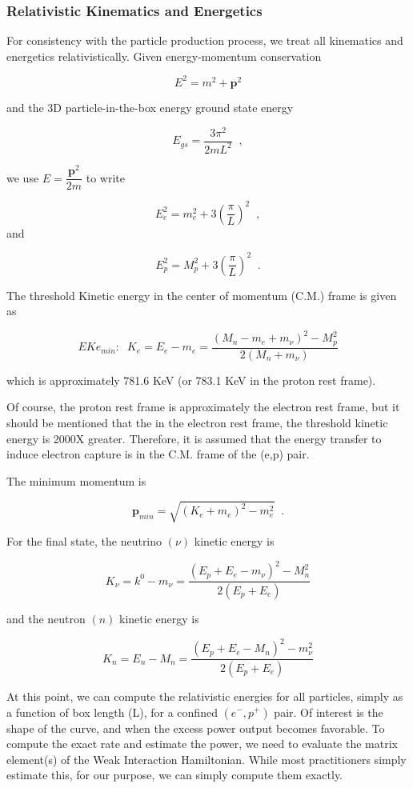 \documentclass[%
 aip,
 jmp,%
 amsmath,amssymb,
 reprint,%
]{revtex4-1}
\begin{document}
\subsubsection{Relativistic Kinematics and Energetics}
For consistency with the particle production process, we treat all kinematics and energetics relativistically.  Given energy-momentum conservation

$$E^{2}=m^{2}+\mathbf{p}^{2}$$

and the 3D particle-in-the-box energy ground state energy 

$$E_{gs}=\dfrac{3\pi^{2}}{2mL^{2}}\;\;,$$

we use $E=\dfrac{\mathbf{p}^{2}}{2m}$ to write

$$E^{2}_{e}=m^{2}_{e}+3\left(\dfrac{\pi}{L}\right)^{2}\;\;,$$ and

$$E^{2}_{p}=M^{2}_{p}+3\left(\dfrac{\pi}{L}\right)^{2}\;\;.$$

The threshold Kinetic energy in the center of momentum (C.M.) frame is given as

$$EKe_{min}:\;\;K_{e}=E_{e}-m_{e}=\dfrac{(M_{n}-m_{e}+m_{\nu})^{2}-M^{2}_{p}}{2(M_{n}+m_{\nu})}$$

which is approximately 781.6 KeV (or 783.1 KeV in the proton rest frame).

Of course, the proton rest frame is approximately the electron rest frame, but it should be mentioned that the in the electron rest frame, the threshold kinetic energy is 2000X greater.  Therefore, it is assumed that the energy transfer to induce electron capture is in the C.M. frame of the (e,p) pair.

The minimum momentum is 

$$\mathbf{p}_{min}=\sqrt{(K_{e}+m_{e})^{2}-m_{e}^{2}}\;\;.$$

For the final state, the neutrino $(\nu)$ kinetic energy is

$$K_{\nu}=k^{0}-m_{\nu}=\dfrac{(E_{p}+E_{e}-m_{\nu})^{2}-M^{2}_{n}}{2(E_{p}+E_{e})}$$

and the neutron $(n)$ kinetic energy is

$$K_{n}=E_{n}-M_{n}=\dfrac{(E_{p}+E_{e}-M_{n})^{2}-m^{2}_{\nu}}{2(E_{p}+E_{e})}$$

At this point, we can compute the relativistic energies for all particles, simply as a function of box length (L), for a confined $(e^{-},p^{+})$ pair.  Of interest is the shape of the curve, and when the excess power output becomes favorable.  To compute the exact rate and estimate the power, we need to evaluate the matrix element(s) of the Weak Interaction Hamiltonian.  
While most practitioners simply estimate this, for our purpose, we can simply compute them exactly.
\end{document}
